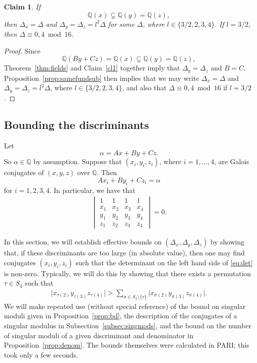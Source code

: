 \documentclass[11pt,a4paper, british]{amsart}
\newtheorem{claim}[thm]{Claim}
\theoremstyle{definition}
\theoremstyle{remark}
\numberwithin{equation}{section}
\newcommand{\Q}{\mathbb{Q}} %
\begin{document}
\begin{claim}\label{cl9}
	If
	\[\Q(x) \subsetneq \Q(y) = \Q(z),\]
	then $\Delta_x = \Delta$ and $\Delta_y = \Delta_z = l^2 \Delta$ for some $\Delta$, where $l \in \{3/2, 2, 3, 4\}$. If $l = 3/2$, then $\Delta \equiv 0, 4 \bmod 16$.
\end{claim}

\begin{proof}
	Since
	\[ \Q(B y + C z) = \Q(x) \subsetneq \Q(y) = \Q(z),\]
Theorem~\ref{thm:fields} and Claim~\ref{cl1} together imply that $\Delta_y = \Delta_z$ and $B=C$. Proposition~\ref{prop:samefundsub} then implies that we may write $\Delta_x = \Delta$ and $\Delta_y = \Delta_z = l^2 \Delta$, where $l \in \{3/2, 2, 3, 4\}$, and also that $\Delta \equiv 0, 4 \bmod 16$ if $l = 3/2$.
\end{proof}


\subsection{Bounding the discriminants}\label{subsec:bd}

Let
\[ \alpha = A x + B y + C z.\]
So $\alpha \in \Q$ by assumption. Suppose that $(x_i, y_i, z_i)$, where $i=1, \ldots, 4$, are Galois conjugates of $(x, y, z)$ over $\Q$. Then
\[ A x_i + B y_i + C z_i = \alpha\]
for $i=1, 2, 3, 4$. In particular, we have that
\begin{align}\label{eq:det}
	\begin{vmatrix}
		1 & 1 & 1 & 1\\
		x_1 & x_2 & x_3 & x_4\\
		y_1 & y_2 & y_3 & y_4\\
		z_1 & z_2 & z_3 & z_4
	\end{vmatrix}= 0.
\end{align}

In this section, we will establish effective bounds on $(\Delta_x, \Delta_y, \Delta_z)$ by showing that, if these discriminants are too large (in absolute value), then one may find conjugates $(x_i, y_i, z_i)$ such that the determinant on the left hand side of \eqref{eq:det} is non-zero. Typically, we will do this by showing that there exists a permutation $\tau \in S_4$ such that
\begin{align*}
	\lvert x_{\tau(2)} y_{\tau(3)} z_{\tau(4)} \rvert > \sum_{\sigma \in S_4 \setminus \{\tau\}} \lvert x_{\sigma(2)} y_{\sigma(3)} z_{\sigma(4)} \rvert.
\end{align*}
We will make repeated use (without special reference) of the bound on singular moduli given in Proposition~\ref{prop:bd}, the description of the conjugates of a singular modulus in Subsection~\ref{subsec:singmods}, and the bound on the number of singular moduli of a given discriminant and denominator in Proposition~\ref{prop:denom}. The bounds themselves were calculated in PARI; this took only a few seconds.
\end{document}
